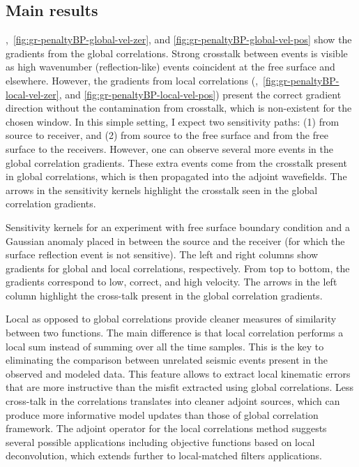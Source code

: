 \subsection{Main results}

,~\ref{fig:gr-penaltyBP-global-vel-zer},
and \ref{fig:gr-penaltyBP-global-vel-pos} show the gradients from the global
correlations. Strong crosstalk between events is visible as high wavenumber
(reflection-like) events coincident at the free surface and elsewhere. However, the gradients
from local correlations (,~\ref{fig:gr-penaltyBP-local-vel-zer},
and \ref{fig:gr-penaltyBP-local-vel-pos}) present the correct gradient direction
without the contamination from crosstalk, which is non-existent for the
chosen window.
 In this simple setting, I expect two sensitivity paths:
(1) from source to receiver, and (2) from source to the free surface and
from the free surface to the receivers. However, one can observe several more
events in the global correlation gradients. These extra events come from the
crosstalk present in global correlations, which is then propagated into the
adjoint wavefields. The arrows in the sensitivity kernels highlight the crosstalk
seen in the global correlation gradients.  

 {Sensitivity kernels for an
experiment with free surface boundary condition and a Gaussian anomaly placed
in between the source and the receiver (for which the surface reflection
event is not sensitive). The left and right columns show gradients for global
 and local correlations, respectively. From top to bottom, the
gradients correspond to low, correct, and high velocity. The arrows in the
left column highlight the cross-talk present in the global correlation gradients.}


Local as opposed to global correlations provide cleaner measures of similarity
between two functions. The main difference is that local correlation performs
a local sum instead of summing over all the time samples. This is the key to
eliminating the comparison between unrelated seismic events present in the
observed and modeled data. This feature allows to extract local kinematic
errors that are more instructive than the misfit extracted using global
correlations. Less cross-talk in the correlations translates into cleaner
adjoint sources, which can produce more informative model updates than those of
global correlation framework.
 The adjoint operator for the local correlations method suggests several
possible applications including objective functions based on local deconvolution,
 which extends further to local-matched filters applications. 








